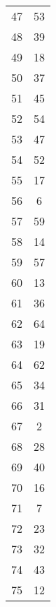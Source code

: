 \begin{table}
\begin{tabular}{c c }
47 & 53 \\
48 & 39 \\
49 & 18 \\
50 & 37 \\
51 & 45 \\
52 & 54 \\
53 & 47 \\
54 & 52 \\
55 & 17 \\
56 & 6 \\
57 & 59 \\
58 & 14 \\
59 & 57 \\
60 & 13 \\
61 & 36 \\
62 & 64 \\
63 & 19 \\
64 & 62 \\
65 & 34 \\
66 & 31 \\
67 & 2 \\
68 & 28 \\
69 & 40 \\
70 & 16 \\
71 & 7 \\
72 & 23 \\
73 & 32 \\
74 & 43 \\
75 & 12 \\
\hline
\end{tabular}
\end{table}